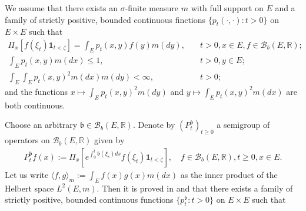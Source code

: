 \documentclass[12pt,a4paper]{amsart}
\numberwithin{equation}{section}
\theoremstyle{plain}
\theoremstyle{definition}
\theoremstyle{remark}
\newcounter{N}
\newcounter{n}[N]
\begin{document}
	We assume  that there exists an $\sigma$-finite measure $m$ with full support on $E$ and a family of strictly positive, bounded continuous finctions $\{p_t(\cdot,\cdot): t>0\}$ on $E\times E$ such that
\begin{align}
	\Pi_x[f(\xi_t)\mathbf 1_{t< \zeta}] = \int_E p_t(x,y) f(y)m(dy), & \quad t>0, x\in E, f\in \mathcal B_b(E,\mathbb R);
	\\ \int_E p_t(x,y) m(dx) \leq 1, &\quad t>0, y\in E;
	\\ \int_E \int_E p_t(x,y)^2 m(dx)m(dy) < \infty, &\quad t>0;
\end{align}
	and the functions $x \mapsto \int_E p_t(x,y)^2m(dy)$ and $y\mapsto \int_E p_t(x,y)^2m(dx)$ are both continuous.

Choose an arbitrary $ \mathfrak b\in \mathcal B_b(E,\mathbb R)$.
Denote by $(P_t^\mathfrak b)_{t\geq 0}$ a semigroup of operators on $\mathcal B_b(E,\mathbb R)$ given by
\begin{align} P_t^\mathfrak b f(x):= \Pi_x[e^{\int_0^t \mathfrak b(\xi_s)ds} f(\xi_t)\mathbf 1_{t< \zeta}],\quad f\in \mathcal B_b(E, \mathbb R), t\geq 0, x\in E. \end{align}
Let us write $\langle f,g \rangle_m:= \int_E f(x)g(x) m(dx)$ as the inner product of the Helbert space $L^2(E,m)$.
Then it is proved in \cite{RenSongZhang2015Limit} and \cite{RenSongZhang2017Central} that there exists a family of strictly positive, bounded continuous functions $\{p_t^\mathfrak b: t> 0\}$ on $E\times E$ such that
\end{document}
